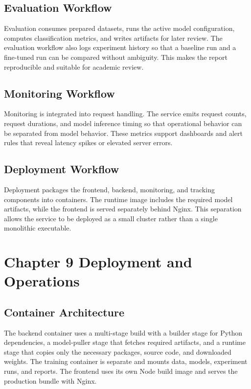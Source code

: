 \documentclass[12pt, a4paper]{article}
\begin{document}
\subsection{Evaluation Workflow}
Evaluation consumes prepared datasets, runs the active model configuration, computes classification metrics, and writes artifacts for later review. The evaluation workflow also logs experiment history so that a baseline run and a fine-tuned run can be compared without ambiguity. This makes the report reproducible and suitable for academic review.

\subsection{Monitoring Workflow}
Monitoring is integrated into request handling. The service emits request counts, request durations, and model inference timing so that operational behavior can be separated from model behavior. These metrics support dashboards and alert rules that reveal latency spikes or elevated server errors.

\subsection{Deployment Workflow}
Deployment packages the frontend, backend, monitoring, and tracking components into containers. The runtime image includes the required model artifacts, while the frontend is served separately behind Nginx. This separation allows the service to be deployed as a small cluster rather than a single monolithic executable.

\section{Chapter 9 Deployment and Operations}

\subsection{Container Architecture}
The backend container uses a multi-stage build with a builder stage for Python dependencies, a model-puller stage that fetches required artifacts, and a runtime stage that copies only the necessary packages, source code, and downloaded weights. The training container is separate and mounts data, models, experiment runs, and reports. The frontend uses its own Node build image and serves the production bundle with Nginx.
\end{document}
